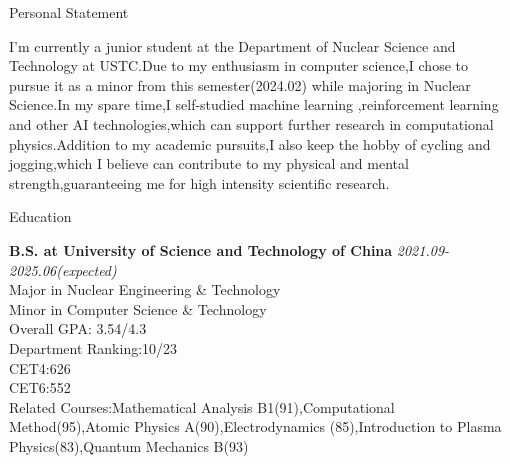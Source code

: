 \documentclass[
	11pt, %
]{resume} %
\begin{document}
\begin{rSection}{Personal Statement}

I'm currently a junior student at the Department of Nuclear Science and Technology at USTC.Due to 
my enthusiasm in computer science,I chose to pursue it as a minor from this
semester(2024.02) while majoring in Nuclear Science.In my spare time,I 
self-studied machine learning ,reinforcement learning and other AI technologies,which can 
support further research in computational physics.Addition to my academic pursuits,I also keep the hobby of cycling and 
jogging,which I believe can contribute to my physical and mental strength,guaranteeing me 
for high intensity scientific research.
\end{rSection}


\begin{rSection}{Education}
	
	\textbf{B.S. at University of Science and Technology of China} \hfill \textit{2021.09-2025.06(expected)} \\ 
	Major in Nuclear Engineering \& Technology \\
	Minor in Computer Science \& Technology \smallskip \\
	Overall GPA: 3.54/4.3\\
	Department Ranking:10/23\\
	CET4:626\\
	CET6:552\\
	Related Courses:Mathematical Analysis B1(91),Computational Method(95),Atomic Physics A(90),Electrodynamics
(85),\allowbreak Introduction to Plasma Physics(83),Quantum Mechanics B(93)
	
\end{rSection}

\end{document}
